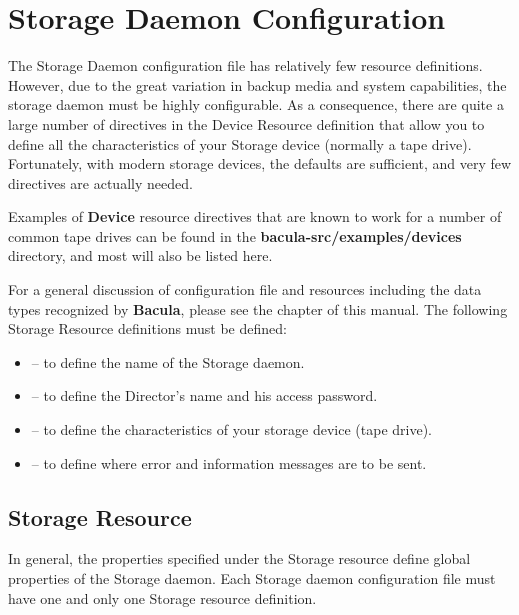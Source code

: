 
\chapter{Storage Daemon Configuration}
\label{StoredConfChapter}

The Storage Daemon configuration file has relatively few resource definitions.
However, due to the great variation in backup media and system capabilities,
the storage daemon must be highly configurable. As a consequence, there are
quite a large number of directives in the Device Resource definition that
allow you to define all the characteristics of your Storage device (normally a
tape drive). Fortunately, with modern storage devices, the defaults are
sufficient, and very few directives are actually needed. 

Examples of {\bf Device} resource directives that are known to work for a
number of common tape drives can be found in the {\bf
\lt{}bacula-src\gt{}/examples/devices} directory, and most will also be listed
here. 

For a general discussion of configuration file and resources including the
data types recognized by {\bf Bacula}, please see the 
 chapter of this manual. The
following Storage Resource definitions must be defined: 

\begin{itemize}
\item 
    -- to define the  name of the
   Storage daemon.  
\item 
    -- to  define the Director's
   name and his access password.  
\item 
    -- to define  the
   characteristics of your storage device (tape  drive).  
\item 
    -- to define where error  and
   information messages are to be sent. 
\end{itemize}

\section{Storage Resource}
\label{StorageResource}

In general, the properties specified under the Storage resource define global
properties of the Storage daemon. Each Storage daemon configuration file must
have one and only one Storage resource definition. 

